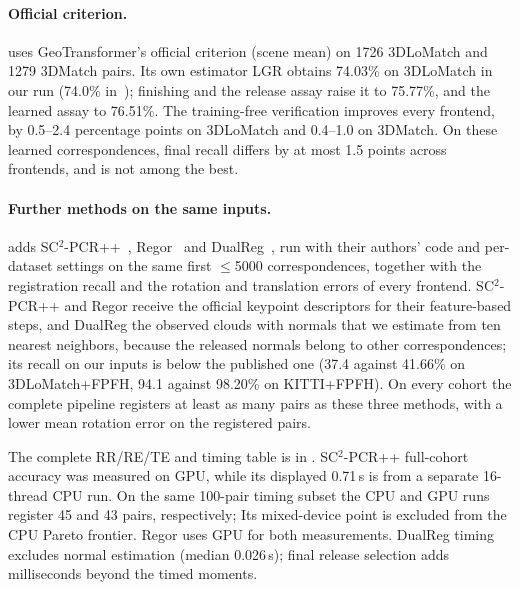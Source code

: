 \paragraph{Official criterion.}  uses GeoTransformer's official criterion (scene mean) on 1726 3DLoMatch and 1279 3DMatch pairs. Its own estimator LGR obtains 74.03\% on 3DLoMatch in our run (74.0\% in~\cite{qin2022geotransformer}); finishing and the release assay raise it to 75.77\%, and the learned assay to 76.51\%. The training-free verification improves every frontend, by 0.5--2.4 percentage points on 3DLoMatch and 0.4--1.0 on 3DMatch. On these learned correspondences, final recall differs by at most 1.5 points across frontends, and \ls{} is not among the best.

\paragraph{Further methods on the same inputs.}  adds SC$^2$-PCR++~\cite{chen2023sc2pp}, Regor~\cite{zhao2025regor} and DualReg~\cite{li2026dualreg}, run with their authors' code and per-dataset settings on the same first $\le$5000 correspondences, together with the registration recall and the rotation and translation errors of every frontend. SC$^2$-PCR++ and Regor receive the official keypoint descriptors for their feature-based steps, and DualReg the observed clouds with normals that we estimate from ten nearest neighbors, because the released normals belong to other correspondences; its recall on our inputs is below the published one (37.4 against 41.66\% on 3DLoMatch+FPFH, 94.1 against 98.20\% on KITTI+FPFH). On every cohort the complete pipeline registers at least as many pairs as these three methods, with a lower mean rotation error on the registered pairs.

The complete RR/RE/TE and timing table is in . SC$^2$-PCR++ full-cohort accuracy was measured on GPU, while its displayed 0.71\,s is from a separate 16-thread CPU run. On the same 100-pair timing subset the CPU and GPU runs register 45 and 43 pairs, respectively; Its mixed-device point is excluded from the CPU Pareto frontier. Regor uses GPU for both measurements. DualReg timing excludes normal estimation (median 0.026\,s); final release selection adds milliseconds beyond the timed moments.
